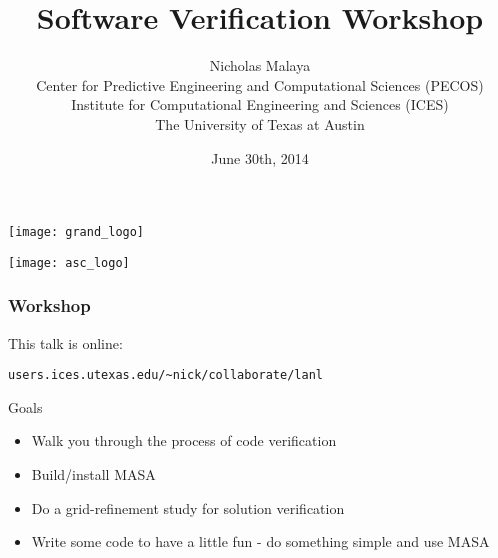 \documentclass[mathserif]{beamer}
\date{June 30th, 2014}
\author[Nicholas Malaya]{Nicholas Malaya \\
$~$ \\
{\small
Center for Predictive Engineering and Computational Sciences (PECOS) \\
Institute for Computational Engineering and Sciences (ICES) \\
The University of Texas at Austin
}
}
\title[Software Verification Workshop]{Software Verification Workshop}
\begin{document}
\begin{frame}
  \begin{center}
    \texttt{[image: grand\_logo]}\\
  \end{center}
  \titlepage
  \begin{flushright}
    \texttt{[image: asc\_logo]}\\
  \end{flushright}
\end{frame}

\begin{frame}[fragile]
  \frametitle{Workshop}
  This talk is online:
\begin{verbatim}users.ices.utexas.edu/~nick/collaborate/lanl \end{verbatim}

  \begin{block}{Goals}
    \begin{itemize} 
    \item Walk you through the process of code verification
    \item Build/install MASA
    \item Do a grid-refinement study for solution verification
    \item Write some code to have a little fun - do something simple
      and use MASA
    \end{itemize}    
  \end{block}

\end{frame}
\end{document}
